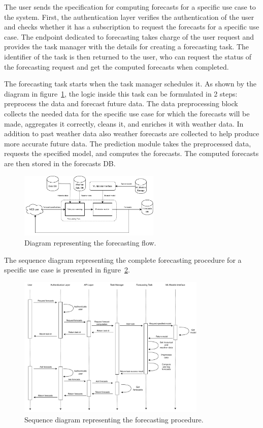 The user sends the specification for computing forecasts for a specific use case to the system.
First, the authentication layer verifies the authentication of the user and checks whether it has a subscription to request the forecasts for a specific use case.
The endpoint dedicated to forecasting takes charge of the user request and provides the task manager with the details for creating a forecasting task.
The identifier of the task is then returned to the user, who can request the status of the forecasting request and get the computed forecasts when completed.

The forecasting task starts when the task manager schedules it.
As shown by the diagram in figure~\ref{fig:forecastflow}, the logic inside this task can be formulated in 2 steps: preprocess the data and forecast future data.
The data preprocessing block collects the needed data for the specific use case for which the forecasts will be made, aggregates it correctly, cleans it, and enriches it with weather data. In addition to past weather data also weather forecasts are collected to help produce more accurate future data.
The prediction module takes the preprocessed data, requests the specified model, and computes the forecasts.
The computed forecasts are then stored in the forecasts DB.

\begin{figure}[H]
\centering
\includegraphics[width=0.6\textwidth]{images/architecture_forecasting_flow}
\caption{Diagram representing the forecasting flow.}
\label{fig:forecastflow}
\end{figure}

The sequence diagram representing the complete forecasting procedure for a specific use case is presented in figure~\ref{fig:forecastingsequence}.

\begin{figure}[H]
\centering
\includegraphics[width=0.8\textwidth]{images/architecture_forecasting_sequence}
\caption{Sequence diagram representing the forecasting procedure.}
\label{fig:forecastingsequence}
\end{figure}


